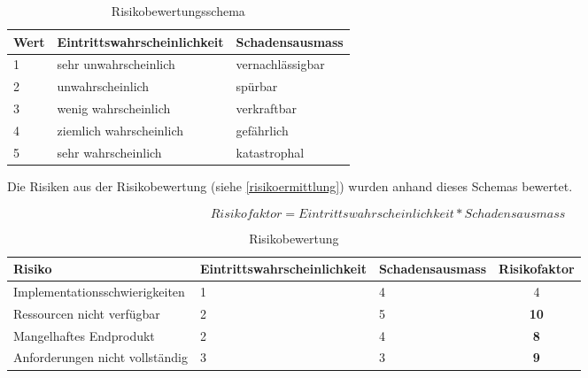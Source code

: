 \begin{table}[ht]
\centering
  \begin{tabular}{ l | p{5cm} | p{5cm} }
	\hline
	\rowcolor{gray}
	Wert							&	Eintrittswahrscheinlichkeit		&	Schadensausmass	\\ \hline			
	1							&	sehr unwahrscheinlich		&	vernachlässigbar	\\ \hline
	2							&	unwahrscheinlich			&	spürbar		\\ \hline
	3							&	wenig wahrscheinlich		&	verkraftbar		\\ \hline
	4							&	ziemlich wahrscheinlich		&	gefährlich		\\ \hline
	5							&	sehr wahrscheinlich			&	katastrophal		\\ \hline
  \end{tabular}
   \caption{Risikobewertungsschema}
\end{table}

\FloatBarrier
Die Risiken aus der Risikobewertung (siehe \ref{risikoermittlung}) wurden anhand dieses Schemas bewertet.

\begin{equation*}
Risikofaktor = Eintrittswahrscheinlichkeit * Schadensausmass
\end{equation*}

\begin{table}[ht]
\centering
  \begin{tabular}{ l | p{4cm} | p{3cm} | c }
	\hline
	\rowcolor{gray}
	Risiko							&	Eintrittswahrscheinlichkeit		&	Schadensausmass 	&	Risikofaktor\\ \hline			
	Implementationsschwierigkeiten			&	1					&	4			&	4		\\ \hline
	Ressourcen nicht verfügbar			&	2					&	5			&	\textbf{10}	\\ \hline
	Mangelhaftes Endprodukt				&	2					&	4			&	\textbf{8}	\\ \hline
	Anforderungen nicht vollständig			&	3					&	3			&	\textbf{9}	\\ \hline
  \end{tabular}
   \caption{Risikobewertung}
\end{table}

